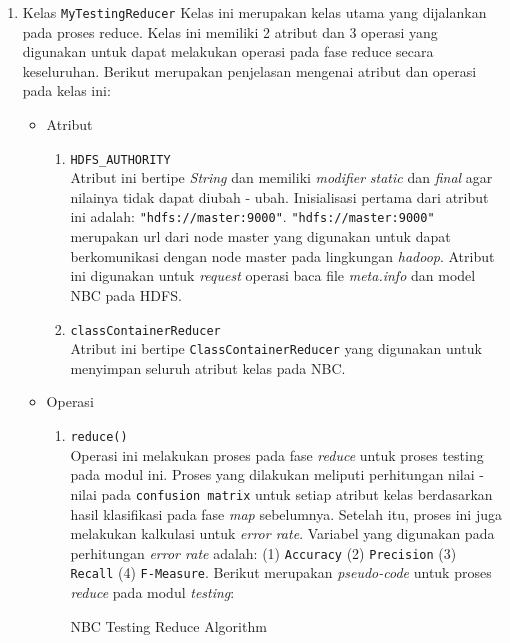 \begin{enumerate}
	\item Kelas \texttt{MyTestingReducer}
	Kelas ini merupakan kelas utama yang dijalankan pada proses reduce. Kelas ini memiliki 2 atribut dan 3 operasi yang digunakan untuk dapat melakukan operasi pada fase reduce secara keseluruhan. Berikut merupakan penjelasan mengenai atribut dan operasi pada kelas ini:
	\begin{itemize}
		\item{Atribut}
		\begin{enumerate}
			\item{\verb|HDFS_AUTHORITY|}\\
			Atribut ini bertipe \textit{String} dan memiliki \textit{modifier} \textit{static} dan \textit{final} agar nilainya tidak dapat diubah - ubah. Inisialisasi pertama dari atribut ini adalah: \verb|"hdfs://master:9000"|. \verb|"hdfs://master:9000"| merupakan url dari node master yang digunakan untuk dapat berkomunikasi dengan node master pada lingkungan \textit{hadoop}. Atribut ini digunakan untuk \textit{request} operasi baca file \textit{meta.info} dan model NBC pada HDFS.
		
			\item{\texttt{classContainerReducer}}\\
			Atribut ini bertipe \texttt{ClassContainerReducer} yang digunakan untuk menyimpan seluruh atribut kelas pada NBC. 
			
		\end{enumerate}
		
		\item{Operasi}
		\begin{enumerate}
			\item{\texttt{reduce()}}\\
			Operasi ini melakukan proses pada fase \textit{reduce} untuk proses testing pada modul ini. Proses yang dilakukan meliputi perhitungan nilai - nilai pada \texttt{confusion matrix} untuk setiap atribut kelas berdasarkan hasil klasifikasi pada fase \textit{map} sebelumnya. Setelah itu, proses ini juga melakukan kalkulasi untuk \textit{error rate}. Variabel yang digunakan pada perhitungan \textit{error rate} adalah: (1) \texttt{Accuracy} (2) \texttt{Precision} (3) \texttt{Recall} (4) \texttt{F-Measure}. Berikut merupakan \textit{pseudo-code} untuk proses \textit{reduce} pada modul \textit{testing}:
			\begin{algorithm}[H]
			\caption{NBC Testing Reduce Algorithm}\label{alg:NBCTestReduce}
			\begin{algorithmic}[1]
			

\end{algorithmic}
\end{algorithm}
\end{enumerate}
\end{itemize}
\end{enumerate}
